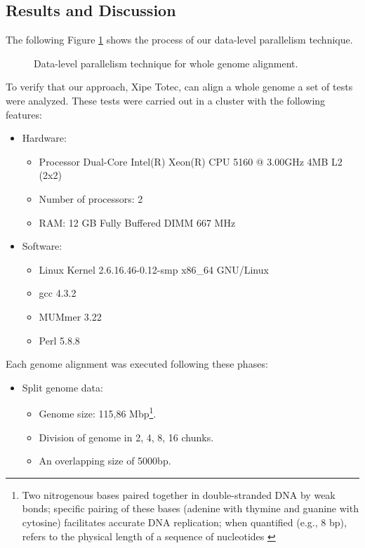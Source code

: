 \documentclass[10pt]{bmc_article}
\newenvironment{bmcformat}{\begin{raggedright}\baselineskip20pt\sloppy\setboolean{publ}{false}}{\end{raggedright}\baselineskip20pt\sloppy}
\begin{document}
\begin{bmcformat}
\section*{Results and Discussion}
The following Figure \ref{algorithm} shows the process of our data-level parallelism technique.
\begin{figure}[htb] 
\begin{center} 
\end{center} 
\caption{Data-level parallelism technique for whole genome alignment.} 
\label{algorithm} 
\end{figure} 
To verify that our approach, Xipe Totec, can align a whole genome a set of tests were analyzed. These tests were carried out in a cluster with the following features:
\begin{itemize}
\item Hardware: 
\begin{itemize}
\item Processor Dual-Core Intel(R) Xeon(R) CPU 5160 @ 3.00GHz 4MB L2 (2x2)
\item Number of processors: 2
\item RAM: 12 GB Fully Buffered DIMM 667 MHz
\end{itemize}
\item  Software:
\begin{itemize}
\item Linux Kernel 2.6.16.46-0.12-smp x86\_64 GNU/Linux
\item gcc 4.3.2
\item MUMmer 3.22
\item Perl 5.8.8
\end{itemize}
\end{itemize}
Each genome alignment was executed following these phases:
\begin{itemize}
\item Split genome data:
\begin{itemize}
\item Genome size: 115,86 Mbp\footnote{Two nitrogenous bases paired together in double-stranded DNA by weak bonds; specific pairing of these bases (adenine with thymine and guanine with cytosine) facilitates accurate DNA replication; when quantified (e.g., 8 bp), refers to the physical length of a sequence of nucleotides \cite{ncbi}}.
\item Division of genome in 2, 4, 8, 16 chunks.
\item An overlapping size of 5000bp.

\end{itemize}
\end{itemize}
\end{bmcformat}
\end{document}
